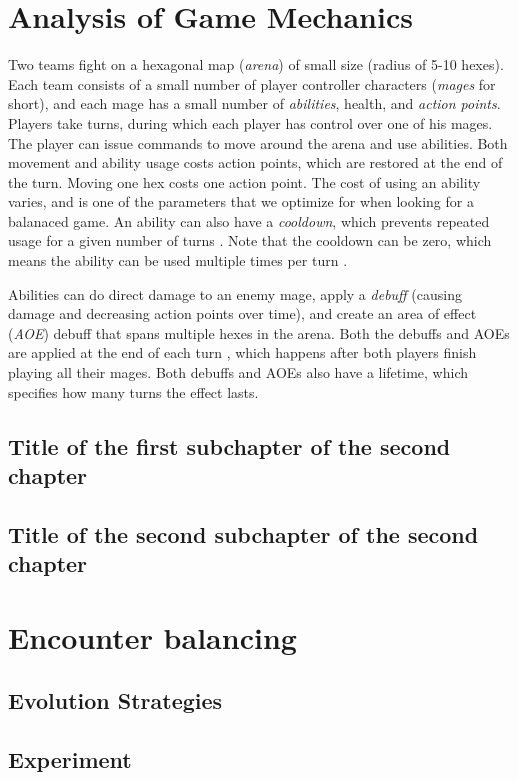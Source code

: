 \chapter{Analysis of Game Mechanics}

Two teams fight on a hexagonal map (\emph{arena}) of small size (radius of 5-10
hexes).   Each team consists of a small number of
player controller characters (\emph{mages} for short), and each mage has a small
number of \emph{abilities}, health, and \emph{action points}. Players take turns,
during which each player has control over one of his mages. The player can
issue commands to move around the arena and use abilities. Both movement and
ability usage costs action points, which are restored at the end of the turn.
Moving one hex costs one action point. The cost of using an ability varies, and
is one of the parameters that we optimize for when looking for a balanaced
game. An ability can also have a \emph{cooldown}, which prevents repeated usage
for a given number of turns . Note that the
cooldown can be zero, which means the ability can be used multiple times per
turn .

Abilities can do direct damage to an enemy mage, apply a \emph{debuff} (causing
damage and decreasing action points over time), and create an area of effect
(\emph{AOE}) debuff that spans multiple hexes in the arena. Both the debuffs and
AOEs are applied at the end of each turn , which happens after both players finish playing all their mages.
Both debuffs and AOEs also have a lifetime, which specifies how many turns
 the effect lasts.


\section{Title of the first subchapter of the second chapter}

\section{Title of the second subchapter of the second chapter}


\chapter{Encounter balancing}

\section{Evolution Strategies}



\section{Experiment}
